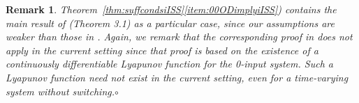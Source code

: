 \documentclass[9pt,final,journal]{IEEEtran}
\newtheorem{teo}{Theorem}
\newtheorem{remark}{Remark}
\def\S{\mathcal{S}}
\def\mer{\hfill $\circ$}
\begin{document}
\begin{remark} 
  \label{rem:extention} 
  Theorem~\ref{thm:suffcondsiISS}\ref{item:00ODimplyiISS}) contains the main result of \cite{jayrya_tac10} (Theorem 3.1) as a particular case, since our assumptions are weaker than those in \cite{jayrya_tac10}. Again, we remark that the corresponding proof in \cite{jayrya_tac10} does not apply in the current setting since that proof is based on the existence of a continuously differentiable Lyapunov function for the 0-input system. Such a Lyapunov function need not exist in the current setting, even for a time-varying system without switching.\mer
\end{remark}
%
%
%
%
\end{document}
